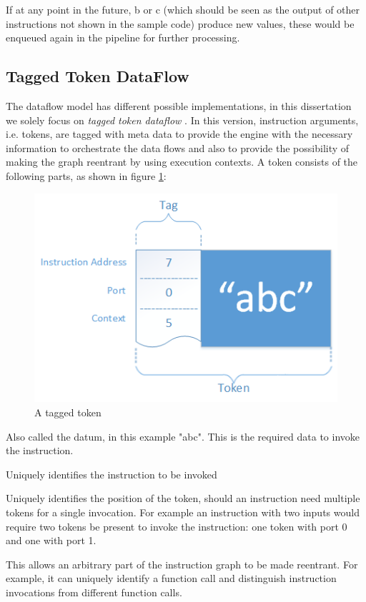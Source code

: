 If at any point in the future, b or c (which should be seen as the output of other instructions not shown in the sample code) produce new values, these would be enqueued again in the pipeline for further processing.

\subsection{Tagged Token DataFlow}

The dataflow model has different possible implementations, in this dissertation we solely focus on \textit{tagged token dataflow} \citep{arvind_executing_1990}.
In this version, instruction arguments, i.e. tokens, are tagged with meta data to provide the engine with the necessary information to orchestrate the data flows and also to provide the possibility of making the graph reentrant by using execution contexts. A token consists of the following parts, as shown in figure \ref{fig:background-dataflow-token}:

\begin{figure}[ht]
	\centerline{\includegraphics[width=\textwidth]{images/background-dataflow-token.png}}
	\caption{A tagged token}
	\label{fig:background-dataflow-token}
\end{figure}

\begin{description}[style=nextline]
	\item[The value] Also called the datum, in this example "abc". This is the required data to invoke the instruction.
	\item[The instruction address] Uniquely identifies the instruction to be invoked
	\item[The port] Uniquely identifies the position of the token, should an instruction need multiple tokens for a single invocation. For example an instruction with two inputs would require two tokens be present to invoke the instruction: one token with port 0 and one with port 1. 
	\item[The execution context] This allows an arbitrary part of the instruction graph to be made reentrant. For example, it can uniquely identify a function call and distinguish instruction invocations from different function calls.
\end{description}



